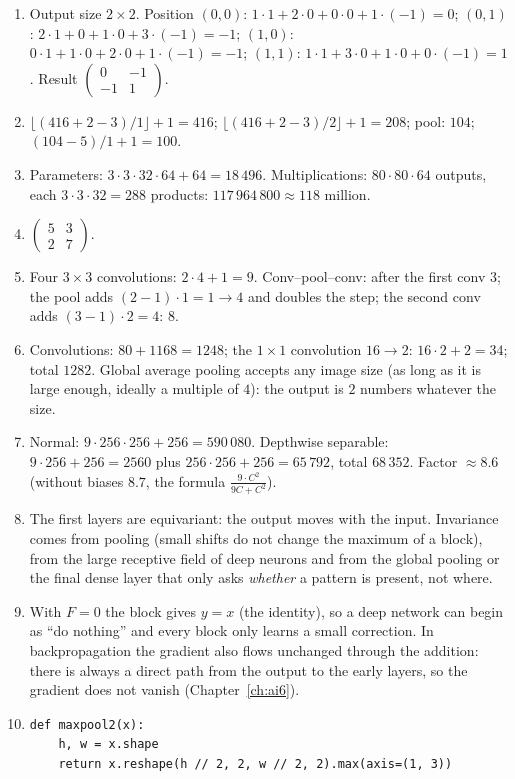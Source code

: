 \begin{enumerate}[label=\textbf{\ansnum.\arabic*}]
  \item Output size $2\times2$. Position $(0,0)$: $1\cdot1+2\cdot0+0\cdot0+1\cdot(-1)=0$; $(0,1)$: $2\cdot1+0+1\cdot0+3\cdot(-1)=-1$; $(1,0)$: $0\cdot1+1\cdot0+2\cdot0+1\cdot(-1)=-1$; $(1,1)$: $1\cdot1+3\cdot0+1\cdot0+0\cdot(-1)=1$. Result $\begin{pmatrix}0&-1\\-1&1\end{pmatrix}$.
  \item $\lfloor(416+2-3)/1\rfloor+1=416$; $\lfloor(416+2-3)/2\rfloor+1=208$; pool: $104$; $(104-5)/1+1=100$.
  \item Parameters: $3\cdot3\cdot32\cdot64+64=18\,496$. Multiplications: $80\cdot80\cdot64$ outputs, each $3\cdot3\cdot32=288$ products: $117\,964\,800\approx118$ million.
  \item $\begin{pmatrix}5&3\\2&7\end{pmatrix}$.
  \item Four $3\times3$ convolutions: $2\cdot4+1=9$. Conv--pool--conv: after the first conv $3$; the pool adds $(2-1)\cdot1=1\to4$ and doubles the step; the second conv adds $(3-1)\cdot2=4$: $8$.
  \item Convolutions: $80+1168=1248$; the $1\times1$ convolution $16\to2$: $16\cdot2+2=34$; total $1282$. Global average pooling accepts any image size (as long as it is large enough, ideally a multiple of $4$): the output is $2$ numbers whatever the size.
  \item Normal: $9\cdot256\cdot256+256=590\,080$. Depthwise separable: $9\cdot256+256=2560$ plus $256\cdot256+256=65\,792$, total $68\,352$. Factor $\approx8.6$ (without biases $8.7$, the formula $\frac{9\cdot C^2}{9C+C^2}$).
  \item The first layers are equivariant: the output moves with the input. Invariance comes from pooling (small shifts do not change the maximum of a block), from the large receptive field of deep neurons and from the global pooling or the final dense layer that only asks \emph{whether} a pattern is present, not where.
  \item With $F=0$ the block gives $y=x$ (the identity), so a deep network can begin as ``do nothing'' and every block only learns a small correction. In backpropagation the gradient also flows unchanged through the addition: there is always a direct path from the output to the early layers, so the gradient does not vanish (Chapter~\ref{ch:ai6}).
  \item[\textbf{\ansnum.10}]
\begin{verbatim}
def maxpool2(x):
    h, w = x.shape
    return x.reshape(h // 2, 2, w // 2, 2).max(axis=(1, 3))


\end{verbatim}
\end{enumerate}

